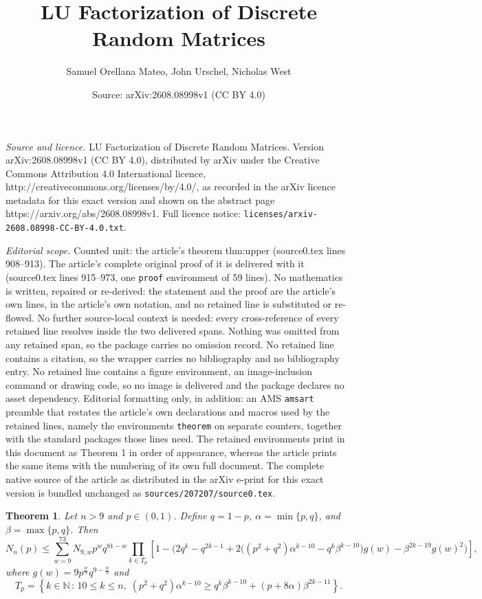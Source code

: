 \documentclass[10pt,a4paper]{amsart}
\title{LU Factorization of Discrete Random Matrices}
\author{Samuel Orellana Mateo, John Urschel, Nicholas West}
\date{Source: arXiv:2608.08998v1 (CC BY 4.0)}
\newtheorem{theorem}{Theorem}
\begin{document}
\maketitle

\noindent\emph{Source and licence.} LU Factorization of Discrete Random Matrices. Version arXiv:2608.08998v1 (CC BY 4.0), distributed by arXiv under the Creative Commons Attribution 4.0 International licence, http://creativecommons.org/licenses/by/4.0/, as recorded in the arXiv licence metadata for this exact version and shown on the abstract page https://arxiv.org/abs/2608.08998v1. Full licence notice: \texttt{licenses/arxiv-2608.08998-CC-BY-4.0.txt}.\par\smallskip

\noindent\textit{Editorial scope.} Counted unit: the article's theorem thm:upper (source0.tex lines 908--913). The article's complete original proof of it is delivered with it (source0.tex lines 915--973, one \texttt{proof} environment of 59 lines). No mathematics is written, repaired or re-derived: the statement and the proof are the article's own lines, in the article's own notation, and no retained line is substituted or re-flowed.  No further source-local context is needed: every cross-reference of every retained line resolves inside the two delivered spans.  Nothing was omitted from any retained span, so the package carries no omission record.  No retained line contains a citation, so the wrapper carries no bibliography and no bibliography entry.  No retained line contains a figure environment, an image-inclusion command or drawing code, so no image is delivered and the package declares no asset dependency.  Editorial formatting only, in addition: an AMS \texttt{amsart} preamble that restates the article's own declarations and macros used by the retained lines, namely the environments \texttt{theorem} on separate counters, together with the standard packages those lines need.  The retained environments print in this document as Theorem 1 in order of appearance, whereas the article prints the same items with the numbering of its own full document.  The complete native source of the article as distributed in the arXiv e-print for this exact version is bundled unchanged as \texttt{sources/207207/source0.tex}.
\begin{theorem}\label{thm:upper}
Let $n > 9$ and $p \in (0,1)$. Define $q = 1-p$, $\alpha = \min\{p,q\}$, and $\beta = \max\{p,q\}$. Then
\[N_n(p) \le \sum_{w=9}^{73} N_{9,w} p^{w}q^{81-w} \prod_{k \in T_p} \left[1 - \big(2q^k -q^{2k-1} +2 \big((p^2 + q^2) \alpha^{k-10} - q^k \beta^{k-10} \big) g(w) - \beta^{2k-19} g(w)^2\big) \right],\]
where $g(w) = 9 p^{\frac{w}{9}} q^{9-\frac{w}{9}}$ and
\[T_p = \left\{ k \in \mathbb{N} \,:\, 10\le k \le n,\; (p^2 + q^2) \alpha^{k-10} \ge q^k \beta^{k-10} + (p + 8 \alpha) \beta^{2k-11} \right\}.\]
\end{theorem}
\end{document}
